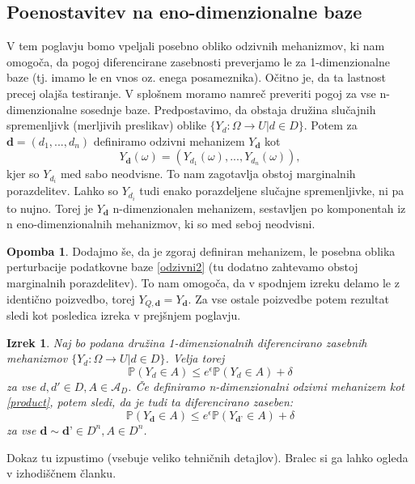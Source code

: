 \documentclass[12pt,a4paper]{amsart}
\theoremstyle{definition} %
\newtheorem{opomba}[definicija]{Opomba}
\theoremstyle{plain} %
\newtheorem{izrek}[definicija]{Izrek}
\begin{document}
\subsection{Poenostavitev na eno-dimenzionalne baze}
V tem poglavju bomo vpeljali posebno obliko odzivnih mehanizmov, ki nam omogoča, da pogoj diferencirane zasebnosti preverjamo le za 1-dimenzionalne baze (tj. imamo le en vnos oz. enega posameznika). Očitno je, da ta lastnost precej olajša testiranje. V splošnem moramo namreč preveriti pogoj za vse n-dimenzionalne sosednje baze.
\newline
\newline
Predpostavimo, da obstaja družina slučajnih spremenljivk (merljivih preslikav) oblike $\{ Y_d: \Omega \rightarrow U | d \in D\}$.  Potem za $\textbf{d} = (d_1,...,d_n)$ definiramo odzivni mehanizem $Y_{\textbf{d}}$ kot  
\begin{equation}\label{product}
Y_{\textbf{d}} (\omega) = (Y_{d_1} (\omega) , ... , Y_{d_n} (\omega)), \tag{5}
\end{equation}
kjer so $Y_{d_i}$ med sabo neodvisne. To nam zagotavlja obstoj marginalnih porazdelitev.  Lahko so $Y_{d_i}$ tudi enako porazdeljene slučajne spremenljivke, ni pa to nujno. Torej je $Y_{\textbf{d}}$ n-dimenzionalen mehanizem, sestavljen po komponentah iz n eno-dimenzionalnih mehanizmov, ki so med seboj neodvisni. 
\newline
\newline
\begin{opomba} Dodajmo še, da je zgoraj definiran mehanizem, le posebna oblika perturbacije podatkovne baze \eqref{odzivni2} (tu dodatno zahtevamo obstoj marginalnih porazdelitev). To nam omogoča, da v spodnjem izreku delamo le z identično poizvedbo, torej $Y_{Q, \textbf{d}}=Y_{\textbf{d}}$. Za vse ostale poizvedbe potem rezultat sledi kot posledica izreka v prejšnjem poglavju. 
\end{opomba}
\begin{izrek} Naj bo podana družina 1-dimenzionalnih diferencirano zasebnih mehanizmov $\{ Y_d: \Omega \rightarrow U | d \in D\}$. Velja torej
$$\mathbb{P}(Y_d \in A) \leq e^\epsilon \mathbb{P}(Y_d \in A) + \delta$$ 
za vse $d,d' \in D, A \in \mathcal{A}_D$. Če definiramo n-dimenzionalni odzivni mehanizem kot \eqref{product}, potem sledi, da je tudi ta diferencirano zaseben:
$$\mathbb{P}(Y_{\textbf{d}} \in A) \leq e^\epsilon \mathbb{P}(Y_{\textbf{d'}} \in A) + \delta$$
za vse $\textbf{d} \sim \textbf{d'} \in D^n, A \in D^n$.
\end{izrek}
Dokaz tu izpustimo (vsebuje veliko tehničnih detajlov). Bralec si ga lahko ogleda v izhodiščnem članku.
\end{document}
